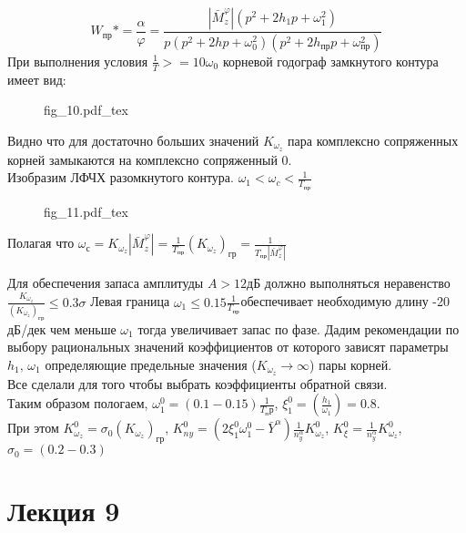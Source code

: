 \documentclass{article}
\begin{document}
\[
W_{пр}* = {\frac{\alpha}{\varphi}} = \frac{|\bar{M}_z^\varphi| (p^2 + 2h_1 p + \omega_1^2)} {p(p^2 + 2 hp + \omega_0^2) (p^2 + 2h_{пр}p + \omega_{пр}^2)} 
\]
При выполнения условия $\frac{1}{T} >= 10 \omega_0$ корневой годограф замкнутого контура имеет вид:\\
\begin{figure}[H]
\centering
{fig_10.pdf_tex}
\end{figure}
Видно что для достаточно больших значений $K_{\omega_z}$ пара комплексно сопряженных корней замыкаются на комплексно сопряженный 0.\\
Изобразим ЛФЧХ разомкнутого контура.
$\omega_1 < \omega_c < \frac{1}{T_{пр}}$

\begin{figure}[H]
\centering
{fig_11.pdf_tex}
\end{figure}


Полагая что $\omega_с = K_{\omega_z} | \bar{M}_z^\varphi| = \frac{1}{T_{пр}}
(K_{\omega_z})_{гр} = \frac{1}{T_{пр}|\bar{M}_z^\varphi|}$

Для обеспечения запаса амплитуды $A > 12 дБ$ должно выполняться неравенство $\frac{K_{\omega_z}}{(K_{\omega_z})_{гр}} \leq 0.3 \sigma $
Левая граница $\omega_1 \leq 0.15 \frac{1}{T_{пр}}$обеспечивает необходимую длину -20 дБ/дек чем меньше $\omega_1$ тогда увеличивает запас по фазе.
Дадим рекомендации по выбору рациональных значений коэффициентов от которого зависят параметры $h_1, \, \omega_1$ определяющие предельные значения ($K_{\omega_z} \rightarrow\infty$) пары корней.\\
Все сделали для того чтобы выбрать коэффициенты обратной связи. \\ 
Таким образом пологаем, $\omega_1^0 = (0.1 - 0.15) \frac{1}{T_пр}$, $\xi_1^0 = (\frac{h_1}{\omega_1}) = 0.8$.\\
При этом $K_{\omega_z}^0 = \sigma_0 (K_{\omega_z})_{гр}$, $K_{ny}^0 = (2\xi_1^0 \omega_1^0 - \bar{Y}^\alpha) \frac{1}{n_y^\alpha} K_{\omega_z}^0$, $K_{\xi}^0 = \frac{1}{n_y^\alpha} K_{\omega_z}^0$, $\sigma_0 = (0.2 - 0.3)$
\newpage
\section{Лекция 9}
\end{document}
